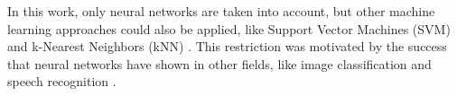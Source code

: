 In this work, only neural networks are taken into account, but other machine learning approaches could also be applied, like Support Vector Machines (SVM) \cite{fitzgerald_using_2012} and k-Nearest Neighbors (kNN) \cite{axelsson_normalised_2010}. This restriction was motivated by the success that neural networks have shown in other fields, like image classification \cite{matan_reading_1992} and speech recognition \cite{graves_speech_2013}.
